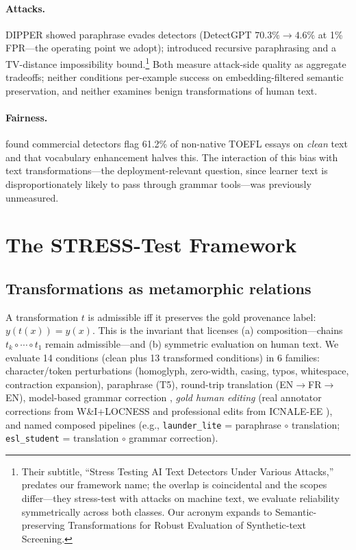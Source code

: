\documentclass[11pt]{article}
\newcommand{\stresstest}{STRESS-Test}
\begin{document}
\paragraph{Attacks.} DIPPER \citep{krishna2023paraphrasing} showed paraphrase
evades detectors (DetectGPT $70.3\%\!\to\!4.6\%$ at 1\% FPR---the operating
point we adopt); \citet{sadasivan2023can} introduced recursive paraphrasing
and a TV-distance impossibility bound.\footnote{Their subtitle, ``Stress
Testing AI Text Detectors Under Various Attacks,'' predates our framework
name; the overlap is coincidental and the scopes differ---they stress-test
with attacks on machine text, we evaluate reliability symmetrically across
both classes. Our acronym expands to Semantic-preserving Transformations for
Robust Evaluation of Synthetic-text Screening.} Both measure attack-side quality as
aggregate tradeoffs; neither conditions per-example success on
embedding-filtered semantic preservation, and neither examines benign transformations of human
text.

\paragraph{Fairness.} \citet{liang2023gpt} found commercial detectors flag
61.2\% of non-native TOEFL essays on \emph{clean} text and that vocabulary
enhancement halves this. The interaction of this bias with text
transformations---the deployment-relevant question, since learner text is
disproportionately likely to pass through grammar tools---was previously
unmeasured.

\section{The \stresstest{} Framework}
\label{sec:framework}

\subsection{Transformations as metamorphic relations}
A transformation $t$ is admissible iff it preserves the gold provenance label:
$y(t(x)) = y(x)$. This is the invariant that licenses (a) composition---chains
$t_k \circ \cdots \circ t_1$ remain admissible---and (b) symmetric evaluation
on human text. We evaluate 14 conditions (clean plus 13 transformed conditions)
in 6 families: character/token
perturbations (homoglyph, zero-width, casing, typos, whitespace, contraction
expansion), paraphrase (T5), round-trip translation (EN$\to$FR$\to$EN),
model-based grammar correction \citep{raheja2023coedit}, \emph{gold human
editing} (real annotator corrections from W\&I+LOCNESS \citep{bryant2019bea}
and professional edits from ICNALE-EE \citep{ishikawa2023icnale}), and named
composed pipelines (e.g., \texttt{launder\_lite} = paraphrase
$\circ$ translation; \texttt{esl\_student} = translation $\circ$ grammar
correction).
\end{document}

